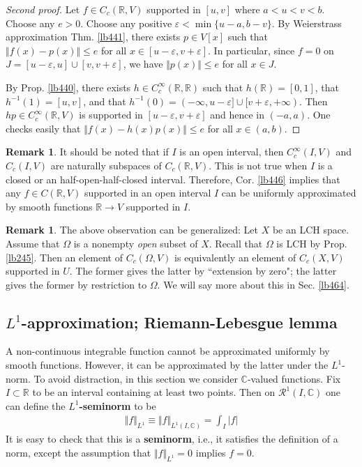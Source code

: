 \documentclass[12pt,b5paper,notitlepage]{article}
\theoremstyle{definition}
\newtheorem{rem}[df]{Remark}
\theoremstyle{plain}
\newcommand{\scr}{\mathscr}
\newcommand{\Cbb}{\mathbb C}
\newcommand{\Rbb}{\mathbb R}
\newcommand{\eps}{\varepsilon}
\numberwithin{equation}{section}
\begin{document}
\begin{proof}[Second proof]
Let $f\in C_c(\Rbb,V)$ supported in $[u,v]$ where $a<u<v<b$. Choose any $e>0$. Choose any positive $\eps<\min\{u-a,b-v\}$. By Weierstrass approximation Thm. \ref{lb441}, there exists $p\in V[x]$ such that $\Vert f(x)- p(x)\Vert\leq e$ for all $x\in[u-\eps,v+\eps]$. In particular, since $f=0$ on $J=[u-\eps,u]\cup[v,v+\eps]$, we have $\Vert p(x)\Vert\leq e$ for all $x\in J$. 

By Prop. \ref{lb440}, there exists $h\in C_c^\infty(\Rbb,\Rbb)$ such that $h(\Rbb)=[0,1]$, that $h^{-1}(1)=[u,v]$, and that $h^{-1}(0)=(-\infty,u-\eps]\cup[v+\eps,+\infty)$. Then $hp\in C_c^\infty(\Rbb,V)$ is supported in $[u-\eps,v+\eps]$ and hence in $(-a,a)$. One checks easily that $\Vert f(x)-h(x)p(x)\Vert\leq e$ for all $x\in(a,b)$.
\end{proof}


\begin{rem}
It should be noted that if $I$ is an open interval, then $C_c^\infty(I,V)$ and $C_c(I,V)$ are naturally subspaces of $C_c(\Rbb,V)$. This is not true when $I$ is a closed or an half-open-half-closed interval. Therefore, Cor. \ref{lb446} implies that any $f\in C(\Rbb,V)$ supported in an open interval $I$ can be uniformly approximated by smooth functions $\Rbb\rightarrow V$ supported in $I$.
\end{rem}


\begin{rem}
The above observation can be generalized: Let $X$ be an LCH space. Assume that $\Omega$ is a nonempty \textit{open} subset of $X$. Recall that $\Omega$ is LCH by Prop. \ref{lb245}. Then an element of $C_c(\Omega,V)$ is equivalently an element of $C_c(X,V)$ supported in $U$. The former gives the latter by ``extension by zero"; the latter gives the former by restriction to $\Omega$. We will say more about this in Sec. \ref{lb464}.
\end{rem}





\subsection{$L^1$-approximation; Riemann-Lebesgue lemma}


A non-continuous integrable function cannot be approximated uniformly by smooth functions. However, it can be approximated by the latter under the $L^1$-norm. To avoid distraction, in this section we consider $\Cbb$-valued functions. Fix $I\subset\Rbb$ to be an interval containing at least two points. Then on $\scr R^1(I,\Cbb)$ one can define the \textbf{$L^1$-seminorm}  to be
\begin{align}
\Vert f\Vert_{L^1}\equiv\Vert f\Vert_{L^1(I,\Cbb)}=\int_I |f|
\end{align}
It is easy to check that this is a \textbf{seminorm}, i.e., it satisfies the definition of a norm, except the assumption that $\Vert f\Vert_{L^1}=0$ implies $f=0$.
\end{document}

